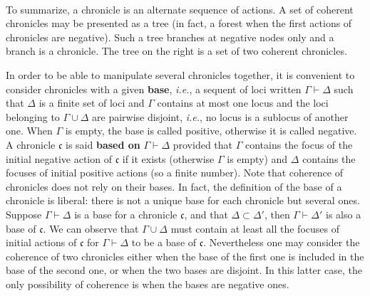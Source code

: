 \documentclass{LMCS}
\def\ie{{\em i.e.}}
\newcommand{\chronicle}[1]{{\mathfrak{#1}}}
\begin{document}
 
\begin{exa}~\\
\begin{minipage}{.66\textwidth}
To summarize, a chronicle is an alternate sequence of actions. A set of coherent chronicles may be presented as a tree (in fact, a forest when the first actions of chronicles are negative). Such a tree branches at negative nodes only and a branch is a chronicle. The tree on the right is a set of two coherent chronicles.
\end{minipage}
\begin{minipage}{.3\textwidth}
\end{minipage}
\end{exa}

In order to be able to manipulate several chronicles together, it is convenient to consider chronicles with a given {\bf base}, \ie, a sequent of loci written $\Gamma\vdash\Delta$ such that $\Delta$ is a finite set of  loci and $\Gamma$ contains at most one locus and the loci belonging to $\Gamma\cup\Delta$ are pairwise disjoint, \ie, no locus is a sublocus of another one. When $\Gamma$ is empty, the base is called positive, otherwise it is called negative.
A chronicle $\chronicle{c}$ is said {\bf based on} $\Gamma\vdash\Delta$ provided that $\Gamma$ contains the focus of the initial negative action of $\chronicle c$ if it exists (otherwise $\Gamma$ is empty) and  $\Delta$ contains the focuses of initial positive actions (so a finite number).
Note that coherence of chronicles does not rely on their bases. In fact,  the definition of the base of a chronicle is liberal: there is not a unique base for each chronicle but several ones. Suppose $\Gamma\vdash\Delta$ is a base for a chronicle $\chronicle c$, and that $\Delta\subset\Delta'$, then $\Gamma\vdash\Delta'$ is also a base of $\chronicle c$.
We can observe that $\Gamma\cup\Delta$ must contain at least all the focuses of initial actions of $\chronicle c$ for $\Gamma\vdash\Delta$ to be a base of $\chronicle c$. 
Nevertheless one may consider the coherence of two chronicles either when the base of the first one is included in the base of the second one, or when the two bases are disjoint. In this latter case, the only possibility of coherence is when the bases are negative ones.
\end{document}
